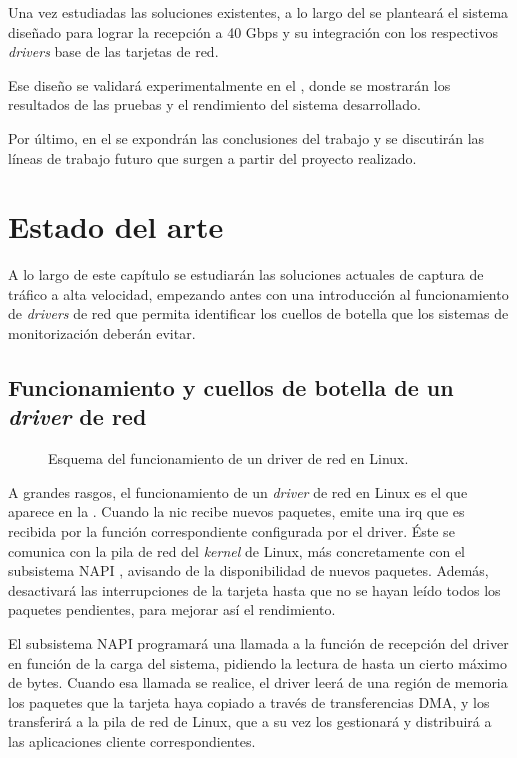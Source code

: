 \documentclass[twoside, 12pt, draft]{epstfg}
\begin{document}
Una vez estudiadas las soluciones existentes, a lo largo del  se planteará el sistema diseñado para lograr la recepción a 40 Gbps y su integración con los respectivos \textit{drivers} base de las tarjetas de red.

Ese diseño se validará experimentalmente en el , donde se mostrarán los resultados de las pruebas y el rendimiento del sistema desarrollado.

Por último, en el  se expondrán las conclusiones del trabajo y se discutirán las líneas de trabajo futuro que surgen a partir del proyecto realizado.

\chapter{Estado del arte}

A lo largo de este capítulo se estudiarán las soluciones actuales de captura de tráfico a alta velocidad, empezando antes con una introducción al funcionamiento de \textit{drivers} de red que permita identificar los cuellos de botella que los sistemas de monitorización deberán evitar.

\section{Funcionamiento y cuellos de botella de un \textit{driver} de red}
\label{sec:EstadoArte:Funcionamiento}

\begin{figure}[hbtp]
\centering

\caption[Funcionamiento de un \textit{driver} de red en Linux]{Esquema del funcionamiento de un \gls{driver} de red en Linux.}
\label{fig:EstadoArte:LinuxNetworkStack}
\end{figure}

A grandes rasgos, el funcionamiento de un \textit{\gls{driver}} de red en Linux es el que aparece en la . Cuando la \gls{nic} recibe nuevos paquetes, emite una \gls{irq} que es recibida por la función correspondiente configurada por el \gls{driver}. Éste se comunica con la pila de red del \textit{kernel} de Linux, más concretamente con el subsistema \gls{NAPI} \cite{NAPI}, avisando de la disponibilidad de nuevos paquetes. Además, desactivará las interrupciones de la tarjeta hasta que no se hayan leído todos los paquetes pendientes, para mejorar así el rendimiento.

El subsistema \gls{NAPI} programará una llamada a la función de recepción del \gls{driver} en función de la carga del sistema, pidiendo la lectura de hasta un cierto máximo de bytes. Cuando esa llamada se realice, el \gls{driver} leerá de una región de memoria los paquetes que la tarjeta haya copiado a través de transferencias DMA, y los transferirá a la pila de red de Linux, que a su vez los gestionará y distribuirá a las aplicaciones cliente correspondientes.
\end{document}
